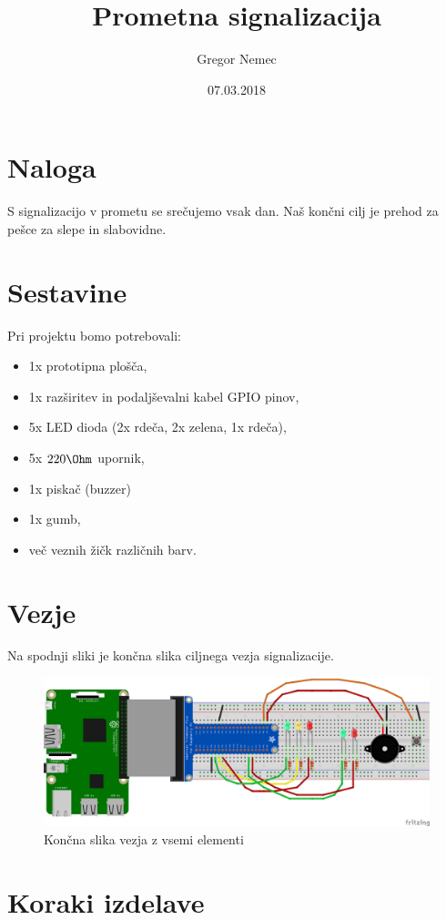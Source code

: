 \documentclass[11pt]{article}
\author{Gregor Nemec}
\date{07.03.2018}
\title{Prometna signalizacija}
\begin{document}
\maketitle

\section{Naloga}
\label{sec:orgb55e861}
S signalizacijo v prometu se srečujemo vsak dan. Naš končni cilj je prehod za
pešce za slepe in slabovidne.

\section{Sestavine}
\label{sec:org96f8664}
Pri projektu bomo potrebovali:
\begin{itemize}
\item 1x prototipna plošča,
\item 1x razširitev in podaljševalni kabel GPIO pinov,
\item 5x LED dioda (2x rdeča, 2x zelena, 1x rdeča),
\item 5x \(220 \Ohm\) upornik,
\item 1x piskač (buzzer)
\item 1x gumb,
\item več veznih žičk različnih barv.
\end{itemize}

\section{Vezje}
\label{sec:org55ca055}
Na spodnji sliki je končna slika ciljnega vezja signalizacije. 

\begin{figure}[htbp]
\centering
\includegraphics[width=.9\linewidth]{breadboard/REB_RES_3LEDsem_2LED_sem_BT_BUZ_bb.png}
\caption{\label{fig:orgb45d077}
Končna slika vezja z vsemi elementi}
\end{figure}

\section{Koraki izdelave}
\label{sec:orgcaf9849}
\end{document}
